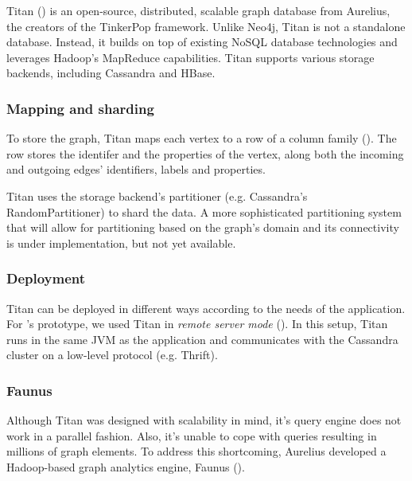 Titan () is an open-source, distributed, scalable graph database from Aurelius, the creators of the TinkerPop framework. Unlike Neo4j, Titan is not a standalone database. Instead, it builds on top of existing NoSQL database technologies and leverages Hadoop's MapReduce capabilities. Titan supports various storage backends, including Cassandra and HBase.


\subsubsection{Mapping and sharding}

To store the graph, Titan maps each vertex to a row of a column family (). The row stores the identifer and the properties of the vertex, along both the incoming and outgoing edges' identifiers, labels and properties.

Titan uses the storage backend's partitioner (e.g. Cassandra's RandomPartitioner) to shard the data. A more sophisticated partitioning system that will allow for partitioning based on the graph's domain and its connectivity is under implementation, but not yet available.


\subsubsection{Deployment}

Titan can be deployed in different ways according to the needs of the application. For \iqd's prototype, we used Titan in \textit{remote server mode} (). In this setup, Titan runs in the same JVM as the application and communicates with the Cassandra cluster on a low-level protocol (e.g. Thrift).


\subsubsection{Faunus}

Although Titan was designed with scalability in mind, it's query engine does not work in a parallel fashion. Also, it's unable to cope with queries resulting in millions of graph elements. To address this shortcoming, Aurelius developed a Hadoop-based graph analytics engine, Faunus ().

